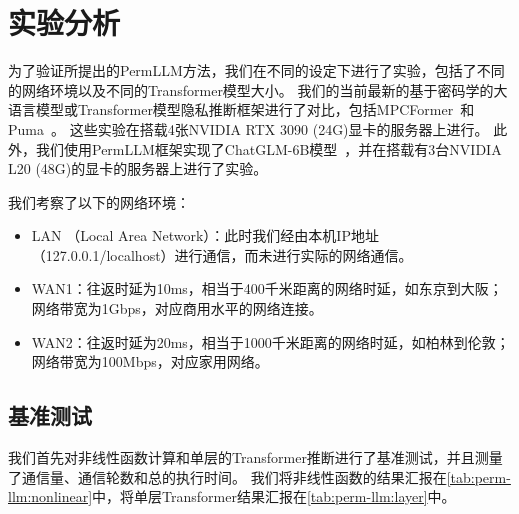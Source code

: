 \section{实验分析}
为了验证所提出的PermLLM方法，我们在不同的设定下进行了实验，包括了不同的网络环境以及不同的Transformer模型大小。
%
我们的当前最新的基于密码学的大语言模型或Transformer模型隐私推断框架进行了对比，包括MPCFormer~\cite{li2022mpcformer}和Puma~\cite{dong2023puma}。
%
这些实验在搭载4张NVIDIA RTX 3090 (24G)显卡的服务器上进行。
%
此外，我们使用PermLLM框架实现了ChatGLM-6B模型~\cite{zeng_2022_glm130b}，并在搭载有3台NVIDIA L20 (48G)的显卡的服务器上进行了实验。
%

我们考察了以下的网络环境：
\begin{itemize}
    \item LAN （Local Area Network）：此时我们经由本机IP地址（127.0.0.1/localhost）进行通信，而未进行实际的网络通信。
    \item WAN1：往返时延为10ms，相当于400千米距离的网络时延，如东京到大阪；网络带宽为1Gbps，对应商用水平的网络连接。
    \item WAN2：往返时延为20ms，相当于1000千米距离的网络时延，如柏林到伦敦；网络带宽为100Mbps，对应家用网络。
\end{itemize}


\subsection{基准测试}
我们首先对非线性函数计算和单层的Transformer推断进行了基准测试，并且测量了通信量、通信轮数和总的执行时间。
我们将非线性函数的结果汇报在\autoref{tab:perm-llm:nonlinear}中，将单层Transformer结果汇报在\autoref{tab:perm-llm:layer}中。
%

